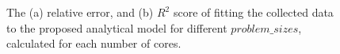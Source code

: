 \begin{figure}[H]
	\centering
	\label{fig64:a}
	\label{fig64:b}
	\caption{The (a) relative error, and (b) $R^2$ score of fitting the collected data to the proposed analytical model for different $problem\_{sizes}$, calculated for each number of cores.}\label{fig64}		
\end{figure}

